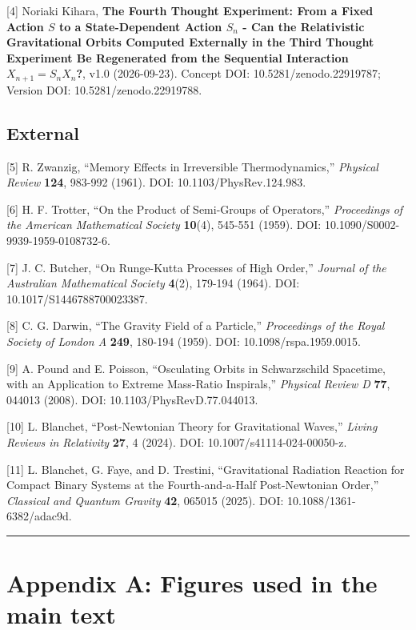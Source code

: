 \documentclass[
  a4paper,
]{article}
\begin{document}
{[}4{]} Noriaki Kihara, \textbf{The Fourth Thought Experiment: From a
Fixed Action \(S\) to a State-Dependent Action \(S_n\) - Can the
Relativistic Gravitational Orbits Computed Externally in the Third
Thought Experiment Be Regenerated from the Sequential Interaction
\(X_{n+1}=S_nX_n\)?}, v1.0 (2026-09-23). Concept DOI:
10.5281/zenodo.22919787; Version DOI: 10.5281/zenodo.22919788.

\subsection{External}\label{external}

{[}5{]} R. Zwanzig, ``Memory Effects in Irreversible Thermodynamics,''
\emph{Physical Review} \textbf{124}, 983-992 (1961). DOI:
10.1103/PhysRev.124.983.

{[}6{]} H. F. Trotter, ``On the Product of Semi-Groups of Operators,''
\emph{Proceedings of the American Mathematical Society} \textbf{10}(4),
545-551 (1959). DOI: 10.1090/S0002-9939-1959-0108732-6.

{[}7{]} J. C. Butcher, ``On Runge-Kutta Processes of High Order,''
\emph{Journal of the Australian Mathematical Society} \textbf{4}(2),
179-194 (1964). DOI: 10.1017/S1446788700023387.

{[}8{]} C. G. Darwin, ``The Gravity Field of a Particle,''
\emph{Proceedings of the Royal Society of London A} \textbf{249},
180-194 (1959). DOI: 10.1098/rspa.1959.0015.

{[}9{]} A. Pound and E. Poisson, ``Osculating Orbits in Schwarzschild
Spacetime, with an Application to Extreme Mass-Ratio Inspirals,''
\emph{Physical Review D} \textbf{77}, 044013 (2008). DOI:
10.1103/PhysRevD.77.044013.

{[}10{]} L. Blanchet, ``Post-Newtonian Theory for Gravitational Waves,''
\emph{Living Reviews in Relativity} \textbf{27}, 4 (2024). DOI:
10.1007/s41114-024-00050-z.

{[}11{]} L. Blanchet, G. Faye, and D. Trestini, ``Gravitational
Radiation Reaction for Compact Binary Systems at the Fourth-and-a-Half
Post-Newtonian Order,'' \emph{Classical and Quantum Gravity}
\textbf{42}, 065015 (2025). DOI: 10.1088/1361-6382/adac9d.

\begin{center}\rule{0.5\linewidth}{0.5pt}\end{center}

\section{Appendix A: Figures used in the main
text}\label{appendix-a-figures-used-in-the-main-text}
\end{document}
